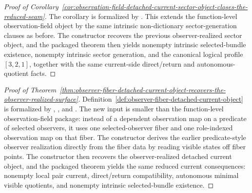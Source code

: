 \begin{proof}[Proof of Corollary~\ref{cor:observation-field-detached-current-sector-object-closes-the-reduced-seam}]
\label{proof:cor:observation-field-detached-current-sector-object-closes-the-reduced-seam}
The corollary is formalized by
. This extends the
function-level observation-field object by the same intrinsic non-dictionary
sector-generation clauses as before. The constructor
recovers the previous observer-realized sector object, and the packaged
theorem  then yields
nonempty intrinsic selected-bundle existence, nonempty intrinsic sector
generation, and the canonical logical profile \([3,2,1]\), together with the
same current-side direct/return and autonomous-quotient facts.
\end{proof}

\begin{proof}[Proof of Theorem~\ref{thm:observer-fiber-detached-current-object-recovers-the-observer-realized-surface}]
\label{proof:thm:observer-fiber-detached-current-object-recovers-the-observer-realized-surface}
Definition~\ref{def:observer-fiber-detached-current-object} is formalized by
,
, and
. The new input is smaller than the
function-level observation-field package: instead of a dependent observation
map on a predicate of selected observers, it uses one selected-observer fiber
and one role-indexed observation map on that fiber. The constructor
derives the earlier predicate-style observer realization directly from the
fiber data by reading visible states off fiber points. The constructor
 then
recovers the observer-realized detached current object, and the packaged
theorem  yields the same
reduced current consequences: nonempty local pair current, direct/return
compatibility, autonomous minimal visible quotients, and nonempty intrinsic
selected-bundle existence.
\end{proof}

